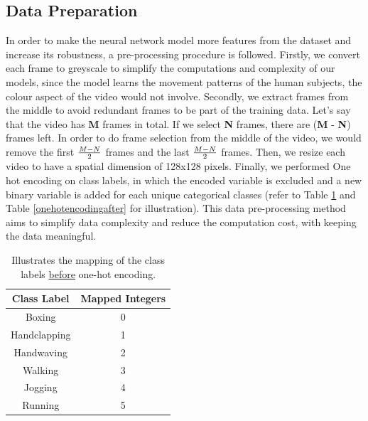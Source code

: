 \documentclass{vldb}
\begin{document}
\subsection{Data Preparation}
In order to make the neural network model more features from the dataset and increase its robustness, a pre-processing procedure is followed. Firstly, we convert each frame to greyscale to simplify the computations and complexity of our models, since the model learns the movement patterns of the human subjects, the colour aspect of the video would not involve. Secondly, we extract frames from the middle to avoid redundant frames to be part of the training data. Let's say that the video has \textbf{M} frames in total. If we select \textbf{N} frames, there are (\textbf{M} - \textbf{N}) frames left. In order to do frame selection from the middle of the video, we would remove the first $\large \frac{M - N}{2}$  frames and the last $\large \frac{M - N}{2}$  frames. Then, we resize each video to have a spatial dimension of 128x128 pixels. Finally, we performed One hot encoding on class labels, in which the encoded variable is excluded and a new binary variable is added for each unique categorical classes (refer to Table \ref{onehotencodingbefore} and Table \ref{onehotencodingafter} for illustration). This data pre-processing method aims to simplify data complexity and reduce the computation cost, with keeping the data meaningful.
\begin{table}[ht]
\centering
\caption{Illustrates the mapping of the class labels \underline{before} one-hot encoding.}
\begin{tabular}{|c|c|}
\hline
\textbf{Class Label} & \textbf{Mapped Integers} \\ \hline
Boxing               & 0                        \\ \hline
Handclapping         & 1                        \\ \hline
Handwaving           & 2                        \\ \hline
Walking              & 3                        \\ \hline
Jogging              & 4                        \\ \hline
Running              & 5                        \\ \hline
\end{tabular}
\label{onehotencodingbefore}
\end{table}
\end{document}
